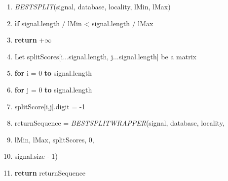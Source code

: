 \documentclass[a4paper,11pt]{article}
\begin{document}
\begin{center}
\begin{enumerate}
\large
\item[] \textit{BESTSPLIT}(signal, database, locality, lMin, lMax)
\item
\textbf{if} signal.length / lMin < signal.length / lMax
\item \hspace{1cm}
\textbf{return} +$\infty$
\item
Let splitScores[i...signal.length, j...signal.length] be a matrix
\item
\textbf{for} i = 0 \textbf{to} signal.length
\item \hspace{1cm}
\textbf{for} j = 0 \textbf{to} signal.length
\item \hspace{2cm}
splitScore[i,j].digit = -1
\item
returnSequence = \textit{BESTSPLITWRAPPER}(signal, database, locality,
\item \hspace{7cm} lMin, lMax, splitScores, 0, 
\item \hspace{7cm} signal.size - 1)
\item
\textbf{return} returnSequence
\end{enumerate}


\end{center}
\end{document}
